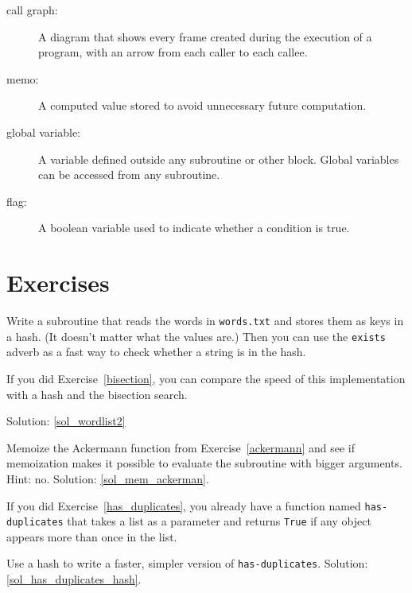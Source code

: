 \begin{description}
\item[call graph:] A diagram that shows every frame created during
the execution of a program, with an arrow from each caller to
each callee. 

\item[memo:] A computed value stored to avoid unnecessary future 
computation.

\item[global variable:]  A variable defined outside any 
subroutine or other block.  Global variables can be 
accessed from any subroutine.

\item[flag:] A boolean variable used to indicate whether a condition
is true.

\end{description}


\section{Exercises}

\begin{exercise}
\label{wordlist2}

Write a subroutine that reads the words in {\tt words.txt} and
stores them as keys in a hash.  (It doesn't matter what the
values are.)  Then you can use the {\tt exists} adverb
as a fast way to check whether a string is in
the hash.

If you did Exercise~\ref{bisection}, you can compare the speed
of this implementation with a hash and the bisection search.

Solution: \ref{sol_wordlist2}

\end{exercise}


\begin{exercise}
\label{mem_ackerman}
Memoize the Ackermann function from Exercise~\ref{ackermann} 
and see if memoization makes it possible to evaluate the 
subroutine with bigger arguments.  Hint: no.
Solution: \ref{sol_mem_ackerman}.

\end{exercise}



\begin{exercise}
\label{has_duplicates_hash}

If you did Exercise~\ref{has_duplicates}, you already have
a function named \verb"has-duplicates" that takes a list
as a parameter and returns {\tt True} if any object
appears more than once in the list.

Use a hash to write a faster, simpler version of
\verb"has-duplicates". 
Solution: \ref{sol_has_duplicates_hash}.

\end{exercise}


